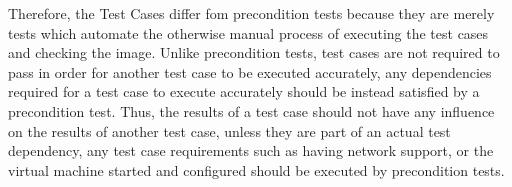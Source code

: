 Therefore, the \cernvm Test Cases differ fom precondition tests because they are merely tests which automate the otherwise
manual process of executing the test cases and checking the \cernvm image. Unlike precondition tests, test cases are not required to
pass in order for another \cernvm test case to be executed accurately, any dependencies required for a test case to execute
accurately should be instead satisfied by a precondition test. Thus, the results of a test case should not have any
influence on the results of another test case, unless they are part of an actual test dependency, any test case requirements
such as having network support, or the virtual machine started and configured should be executed by precondition tests.